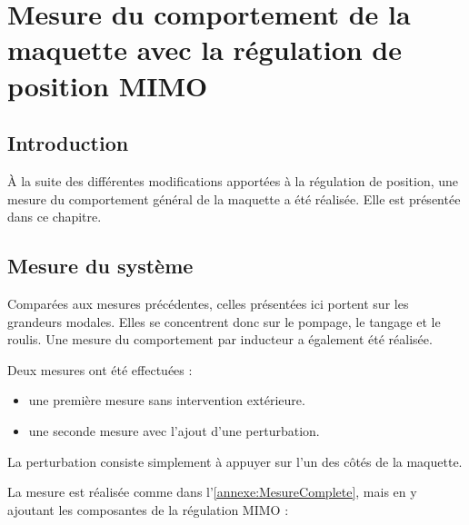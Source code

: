 \chapter{Mesure du comportement de la maquette avec la régulation de position MIMO}

\section{Introduction}
À la suite des différentes modifications apportées à la régulation de position, une mesure du comportement général de la maquette a été réalisée. Elle est présentée dans ce chapitre.

\section{Mesure du système}
Comparées aux mesures précédentes, celles présentées ici portent sur les grandeurs modales. Elles se concentrent donc sur le pompage, le tangage et le roulis. Une mesure du comportement par inducteur a également été réalisée.

Deux mesures ont été effectuées :

\begin{itemize}
    \item une première mesure sans intervention extérieure.
    \item une seconde mesure avec l'ajout d'une perturbation.
\end{itemize}

La perturbation consiste simplement à appuyer sur l'un des côtés de la maquette.

La mesure est réalisée comme dans l'\autoref{annexe:MesureComplete}, mais en y ajoutant les composantes de la régulation MIMO :

